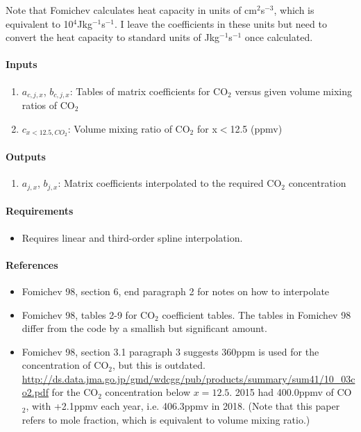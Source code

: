    Note that Fomichev calculates heat capacity in units of cm$^2$s$^{-3}$,
   which is equivalent to 10$^4$Jkg$^{-1}$s$^{-1}$. I leave the coefficients
   in these units but need to convert the heat capacity to standard units
   of Jkg$^{-1}$s$^{-1}$ once calculated.

   \paragraph{Inputs}
   \begin{enumerate}
   \item $a_{c,j,x}$, $b_{c,j,x}$: Tables of matrix coefficients for CO$_2$ 
     versus given volume mixing ratios of CO$_2$
   \item $c_{x<12.5,CO_2}$: Volume mixing ratio of CO$_2$ for x$<$12.5 (ppmv) 
   \end{enumerate}

   \paragraph{Outputs}
   \begin{enumerate}
   \item $a_{j,x}$, $b_{j,x}$: Matrix coefficients interpolated to the 
     required CO$_2$ concentration
   \end{enumerate}

   \paragraph{Requirements}
   \begin{itemize}   
   \item Requires linear and third-order spline interpolation. 
   \end{itemize}

   \paragraph{References}
   \begin{itemize}
   \item Fomichev 98, section 6, end paragraph 2 for notes on how to 
     interpolate
   \item Fomichev 98, tables 2-9 for CO$_2$ coefficient tables. The
     tables in Fomichev 98 differ from the code by a smallish but
     significant amount.
   \item Fomichev 98, section 3.1 paragraph 3 suggests 360ppm is used 
     for the concentration of CO$_2$, but this is outdated.  \\
     \url{http://ds.data.jma.go.jp/gmd/wdcgg/pub/products/summary/sum41/10_03co2.pdf}
     for the CO$_2$ concentration below $x=12.5$. 2015 had 400.0ppmv of 
     CO$_2$, with +2.1ppmv each year, i.e. 406.3ppmv in 2018. (Note that
     this paper refers to mole fraction, which is equivalent to volume
     mixing ratio.)
   \end{itemize}


